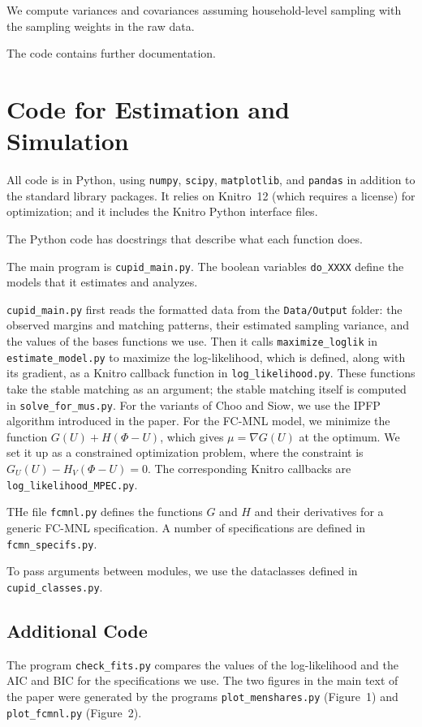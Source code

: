 \documentclass[11pt]{article}
\theoremstyle{plain}
\theoremstyle{definition}
\begin{document}
 We compute variances and covariances assuming household-level sampling with the sampling weights in the raw data.
 
 The code contains further documentation. 
 
 
 


\section{Code for Estimation and Simulation}
All code is in Python, using   \verb|numpy|, \verb|scipy|, \verb|matplotlib|, and \verb|pandas| in addition to the standard library packages. It relies on  Knitro~12 (which requires a license) for optimization; and it includes the Knitro Python interface files. 

The Python code has docstrings that describe what each function does. 

The main program is \verb|cupid_main.py|. The boolean  variables \verb|do_XXXX| define the models that it estimates and analyzes.  

\verb|cupid_main.py| first reads the formatted data from the \verb|Data/Output| folder: the observed margins and matching patterns, their estimated sampling variance, and the  values of the bases functions we use. Then it calls \verb|maximize_loglik| in \verb|estimate_model.py| to maximize the log-likelihood, which is defined, along with its gradient, as a Knitro callback function in \verb|log_likelihood.py|.  These functions take the stable matching as an argument; the stable matching itself is computed in \verb|solve_for_mus.py|. For the variants of Choo and Siow, we use the IPFP algorithm introduced in the paper. For the FC-MNL model, we minimize the function $G(U)+H(\Phi-U)$, which gives $\mu=\nabla G(U)$ at the optimum. We set it up as a constrained optimization problem, where the constraint is $G_U(U)-H_V(\Phi-U)=0$. The corresponding Knitro callbacks are \verb|log_likelihood_MPEC.py|.

THe file \verb|fcmnl.py| defines the functions $G$ and $H$ and their derivatives for a generic FC-MNL specification. A number of specifications are defined in \verb|fcmn_specifs.py|.

To pass arguments between modules, we use the dataclasses defined in \verb|cupid_classes.py|.


\subsection{Additional Code}
The program \verb|check_fits.py| compares the values of the log-likelihood and the AIC and BIC for the specifications we use. The two figures in the main text of the paper were generated by the programs \verb|plot_menshares.py| (Figure~1) and \verb|plot_fcmnl.py| (Figure~2). 
\end{document}
